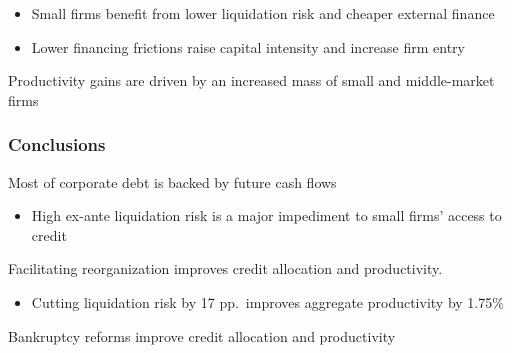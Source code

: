 \documentclass[aspectratio=169,xcolor=table]{beamer}
\begin{document}
\begin{frame}[label=effects]
\begin{itemize} \small
    \item Small firms benefit from lower liquidation risk and cheaper external finance
    \item Lower financing frictions raise capital intensity and increase firm entry
\end{itemize}
Productivity gains are driven by an \textcolor{primary}{increased mass of small and middle-market firms}

\end{frame}


 
\begin{frame}[label=conclusions2] \frametitle{Conclusions}
 

Most of corporate debt is backed by future cash flows
\begin{itemize} \small
    \item High ex-ante liquidation risk is a major impediment to small firms' access to credit
\end{itemize} \normalsize \vspace{3mm}


Facilitating reorganization improves credit allocation and productivity. 
\begin{itemize} \small
    \item Cutting liquidation risk by 17 pp.\ improves aggregate productivity by 1.75\%
\end{itemize} \normalsize \vspace{3mm}

 
Bankruptcy reforms improve credit allocation and productivity \vspace{-4mm}
 

\end{frame}
\end{document}
